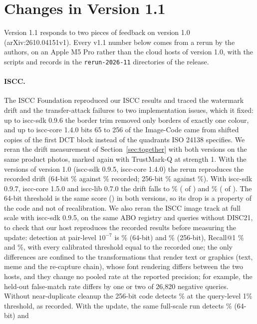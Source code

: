\section{Changes in Version 1.1}
\label{sec:v11}

Version 1.1 responds to two pieces of feedback on version 1.0 (arXiv:2610.04151v1). Every v1.1 number below comes from a rerun by the authors, on an Apple M5 Pro rather than the cloud hosts of version 1.0, with the scripts and records in the \texttt{rerun-2026-11} directories of the release.

\paragraph{ISCC.} The ISCC Foundation reproduced our ISCC results and traced the watermark drift and the transfer-attack failures to two implementation issues, which it fixed: up to iscc-sdk 0.9.6 the border trim removed only borders of exactly one colour, and up to iscc-core 1.4.0 bits 65 to 256 of the Image-Code came from shifted copies of the first DCT block instead of the quadrants ISO 24138 specifies. We reran the drift measurement of Section~\ref{sec:together} with both versions on the same  product photos, marked again with TrustMark-Q at strength 1. With the versions of version 1.0 (iscc-sdk 0.9.5, iscc-core 1.4.0) the rerun reproduces the recorded drift (64-bit \% against \% recorded; 256-bit \% against \%). With iscc-sdk 0.9.7, iscc-core 1.5.0 and iscc-lib 0.7.0 the drift falls to \% ( of ) and \% ( of ). The 64-bit threshold is the same score () in both versions, so its drop is a property of the code and not of recalibration. We also reran the ISCC image track at full scale with iscc-sdk 0.9.5, on the same ABO registry and queries without DISC21, to check that our host reproduces the recorded results before measuring the update: detection at pair-level $10^{-7}$ is \% (64-bit) and \% (256-bit), Recall@1 \% and \%, with every calibrated threshold equal to the recorded one; the only differences are confined to the transformations that render text or graphics (text, meme and the re-capture chain), whose font rendering differs between the two hosts, and they change no pooled rate at the reported precision; for example, the held-out false-match rate differs by one or two of 26{,}820 negative queries. Without near-duplicate cleanup the 256-bit code detects \% at the query-level 1\% threshold, as recorded. With the update, the same full-scale run detects \% (64-bit) and 